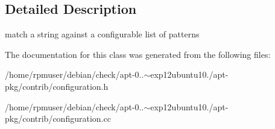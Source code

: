 \subsection{\-Detailed \-Description}
match a string against a configurable list of patterns 

\-The documentation for this class was generated from the following files\-:\begin{DoxyCompactItemize}
\item 
/home/rpmuser/debian/check/apt-\/0..$\sim$exp12ubuntu10./apt-\/pkg/contrib/configuration.\-h\item 
/home/rpmuser/debian/check/apt-\/0..$\sim$exp12ubuntu10./apt-\/pkg/contrib/configuration.\-cc\end{DoxyCompactItemize}

